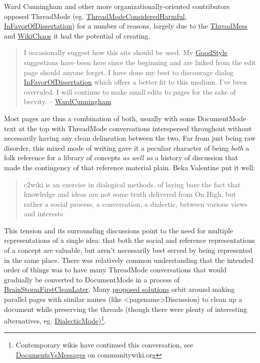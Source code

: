 \documentclass[notoc]{tufte-book}
\begin{document}
Ward Cunningham and other more organizationally-oriented contributors
opposed ThreadMode (eg.
\href{http://wiki.c2.com/?ThreadModeConsideredHarmful}{ThreadModeConsideredHarmful},
\href{http://wiki.c2.com/?InFavorOfDissertation}{InFavorOfDissertation})
for a number of reasons, largely due to the
\href{http://wiki.c2.com/?ThreadMess}{ThreadMess} and
\href{http://wiki.c2.com/?WikiChaos}{WikiChaos} it had the potential of
creating.

\begin{quote}
I occasionally suggest how this site should be used. My
\href{http://wiki.c2.com/?GoodStyle}{GoodStyle} suggestions have been
here since the beginning and are linked from the edit page should anyone
forget. I have done my best to discourage dialog
\href{http://wiki.c2.com/?InFavorOfDissertation}{InFavorOfDissertation}
which offers a better fit to this medium. I've been overruled. I will
continue to make small edits to pages for the sake of brevity. --
\href{http://wiki.c2.com/?WardCunningham}{WardCunningham} \citep{C2wikiWikiHistory} 
\end{quote}

Most pages are thus a combination of both, usually with some
DocumentMode text at the top with ThreadMode conversations interspersed
throughout without necessarily having any clean delineation between the
two. Far from just being raw disorder, this mixed mode of writing gave
it a peculiar character of being \emph{both} a folk reference for a
library of concepts \emph{as well as} a history of discussion that made
the contingency of that reference material plain. Beka Valentine put it
well:

\begin{quote}
c2wiki is an exercise in dialogical methods. of laying bare the fact
that knowledge and ideas are not some truth delivered from On High, but
rather a social process, a conversation, a dialectic, between various
views and interests \citep{valentineC2wikiExerciseDialogical2021} 
\end{quote}

This tension and its surrounding discussions point to the need for
multiple representations of a single idea: that both the social and
reference representations of a concept are valuable, but aren't
necessarily best served by being represented in the same place. There
was relatively common understanding that the intended order of things
was to have many ThreadMode conversations that would gradually be
converted to DocumentMode in a process of
\href{http://wiki.c2.com/?BrainStormFirstCleanLater}{BrainStormFirstCleanLater}.
Many \href{http://wiki.c2.com/?ConvertThreadModeToDocumentMode}{proposed
solutions} orbit around making parallel pages with similar names (like
\textless pagename\textgreater Discussion) to clean up a document while
preserving the threads (though there were plenty of interesting
alternatives, eg.
\href{http://wiki.c2.com/?DialecticMode}{DialecticMode})\footnote{Contemporary
  wikis have continued this conversation, see
  \href{https://communitywiki.org/wiki/DocumentsVsMessages}{DocumentsVsMessages}
  on communitywiki.org}.
\end{document}
